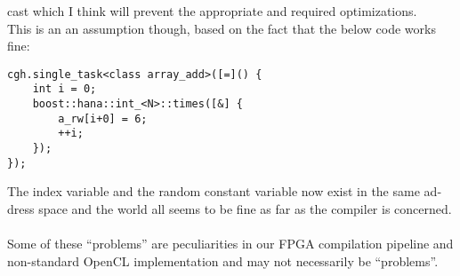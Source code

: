 \begin{otherlanguage}{english}
                                         cast which I think will prevent the
                                         appropriate and required optimizations.
                                         \\
                                         This is an an assumption though, based
                                         on the fact that the below code works
                                         fine:
                                         \begin{code}
                                             \begin{verbatim}
cgh.single_task<class array_add>([=]() {
    int i = 0;
    boost::hana::int_<N>::times([&] {
        a_rw[i+0] = 6;
        ++i;
    });
});
                                             \end{verbatim}
                                         \end{code}
                                         The index variable and the random
                                         constant variable now exist in the same
                                         address space and the world all seems
                                         to be fine as far as the compiler is
                                         concerned.
                                         \\
                                         \\
                                         Some of these ``problems'' are
                                         peculiarities in our FPGA compilation
                                         pipeline and non-standard OpenCL
                                         implementation and may not necessarily
                                         be ``problems''.
\end{otherlanguage}
